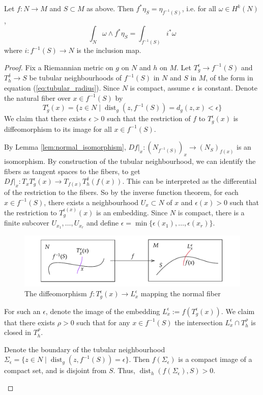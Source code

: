 \begin{thm} %
	Let $f : N \to M$ and  $S \subset M$ as above. Then $f^*\eta_S =
	\eta_{f^{-1}(S)}$,  i.e. for all  $\omega\in H^k(N)$,
	\[
	\int_{N} \omega \wedge f^*\eta_S =\int_{f^{-1}(S)} i^*\omega  
	\]
	where $i: f^{-1}(S) \to N$ is the inclusion map.
\end{thm}
\begin{proof} 
	Fix a Riemannian metric on $g$ on $N$ and $h$ on $M$.
	Let $T^\epsilon_g \to f^{-1}(S)$ and $T^\delta_h \to S$ be tubular
	neighbourhoods of  $f^{-1}(S)$ in $N$ and  $S$ in $M$, of the form in
	equation (\ref{eq:tubular_radius}). Since $N$ is compact, assume  $\epsilon$
	is constant. Denote the natural fiber over  $x\in f^{-1}(S)$ by
	\[
		T^\epsilon_g(x) = \{z \in N \mid \operatorname{dist}_g(z,f^{-1}(S)) 
		= d_g(z,x) < \epsilon\}
	\] 
	We claim that there exists $\epsilon > 0$ such that the restriction of  $f$
	to  $T^\epsilon_g(x)$ is diffeomorphism to its image for all  
	$x\in f^{-1}(S)$. %
	\begin{subproof}
		By Lemma \ref{lem:normal_isomorphism}, 
		$Df|_x : (N_{f^{-1}(S)})_x \to (N_S)_{f(x)}$ is an isomorphism.
		By construction of the tubular neighbourhood, we can identify the fibers
		as tangent spaces to the fibers, to get
		$Df|_x : T_xT_g^\epsilon(x) \to T_{f(x)}T_h^\delta(f(x))$. 
		This can be interpreted as the differential of the restriction to the
		fibers. So by the inverse function theorem, for each $x\in f^{-1}(S)$,
		there exists a neighbourhood $U_x \subset N$ of $x$ and  $\epsilon(x)>0$
		such that the restriction to  $T^{\epsilon(x)}_g(x)$ is an embedding.
		Since $N$ is compact, there is a finite subcover $U_{x_1},\ldots,U_{x_r}$
		and define 
		$
			\epsilon = \min\{\epsilon(x_1),\ldots,\epsilon(x_r)\}
		$. 
	\end{subproof}
	\begin{figure}[htb]
		\centering
		\includegraphics[width=\textwidth]{figs/normal_fiber_map.pdf}
		\caption{The diffeomorphism $f:T^\epsilon_g(x) \to L_x^\epsilon$ mapping
		the normal fiber}
		\label{fig:normal_fiber_map}
	\end{figure}
	For such an $\epsilon$,  denote the image of the embedding  $L_x^\epsilon :=
	f(T^\epsilon_g(x))$. We claim that there exists 
	$\rho > 0$ such that for any  $x\in f^{-1}(S)$ the intersection 
	$L_x^\epsilon \cap T_h^\rho$ is closed in $T^\rho_h$.
	\begin{subproof}
		Denote the boundary of the tubular neighbourhood $\Sigma_\epsilon = \{z\in
		N \mid \operatorname{dist}_g(z,f^{-1}(S)) = \epsilon\}$. 
		Then $f(\Sigma_\epsilon)$ is a compact image of a compact set, and is
		disjoint from $S$.  Thus, 
		$\operatorname{dist}_h(f(\Sigma_\epsilon),S) > 0$.


\end{subproof}
\end{proof}
